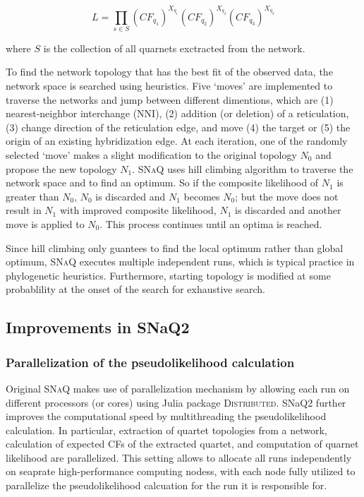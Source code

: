 \documentclass[unnumsec,webpdf,contemporary,large]{oup-authoring-template}%
\theoremstyle{thmstyleone}%
\theoremstyle{thmstyletwo}%
\theoremstyle{thmstylethree}%
\begin{document}
\begin{equation}
    L=\prod_{s \in S}(CF_{q_1})^{X_{q_1}}(CF_{q_2})^{X_{q_2}}(CF_{q_3})^{X_{q_3}}
\label{eqn1}
\end{equation}

\noindent where $S$ is the collection of all quarnets exctracted from the network.

To find the network topology that has the best fit of the observed data, the network space is searched using heuristics.  Five `moves' are implemented to traverse the networks and jump between different dimentions, which are (1) nearest-neighbor interchange (NNI), (2) addition (or deletion) of a reticulation, (3) change direction of the reticulation edge, and move (4) the target or (5) the origin of an existing hybridization edge. At each iteration, one of the randomly selected `move' makes a slight modification to the original topology $N_0$ and propose the new topology $N_1$. \textsc{SNaQ} uses hill climbing algorithm to traverse the network space and to find an optimum. So if the composite likelihood of $N_1$ is greater than $N_0$, $N_0$ is discarded and $N_1$ becomes $N_0$; but the move does not result in $N_1$ with improved composite likelihood, $N_1$ is discarded and another move is applied to $N_0$. This process continues until an optima is reached. 

Since hill climbing only guantees to find the local optimum rather than global optimum, \textsc{SNaQ} executes multiple independent runs, which is typical practice in phylogenetic heuristics. Furthermore, starting topology is modified at some probablility at the onset of the search for exhaustive search. 

\subsection{Improvements in SNaQ2}\label{subsec2}
\subsubsection{Parallelization of the pseudolikelihood calculation}\label{subsubsec1}
Original \textsc{SNaQ} makes use of parallelization mechanism by allowing each run on different processors (or cores) using Julia package \textsc{Distributed}. SNaQ2 further improves the computational speed by multithreading the pseudolikelihood calculation. In particular, extraction of quartet topologies from a network, calculation of expected CFs of the extracted quartet, and computation of quarnet likelihood are parallelized. This setting allows to allocate all runs independently on seaprate high-performance computing nodess, with each node fully utilized to parallelize the pseudolikelihood calcuation for the run it is responsible for.
\end{document}
